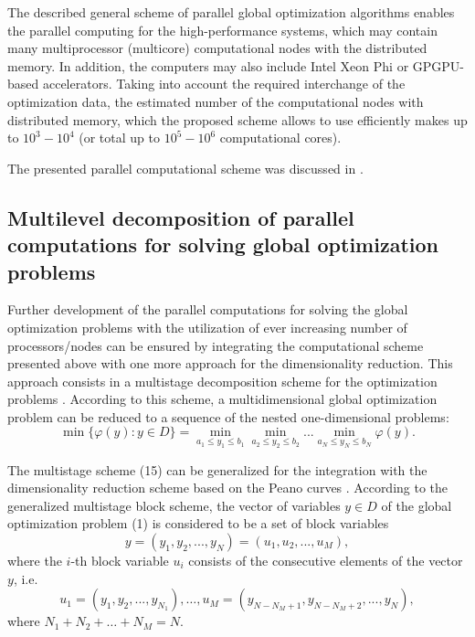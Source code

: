 \documentclass[
11pt,%
tightenlines,%
twoside,%
onecolumn,%
nofloats,%
nobibnotes,%
nofootinbib,%
superscriptaddress,%
noshowpacs,%
centertags]%
{revtex4}
\begin{document}
The described general scheme of parallel global optimization algorithms enables the parallel computing for the high-performance systems, which may contain many multiprocessor (multicore) computational nodes with the distributed memory. In addition, the computers may also include Intel Xeon Phi or GPGPU-based accelerators. Taking into account the required interchange of the optimization data, the estimated number of the computational nodes with distributed memory, which the proposed scheme allows to use efficiently makes up to $10^3-10^4$ (or total up to $10^5-10^6$ computational cores). 

The presented parallel computational scheme was discussed in \cite{Strongin1, Strongin2, Strongin5, Gergel1}.


\subsection{Multilevel decomposition of parallel computations for solving global optimization problems}

Further development of the parallel computations for solving the global optimization problems with the utilization of ever increasing number of processors/nodes can be ensured by integrating the computational scheme presented above with one more approach for the dimensionality reduction. This approach consists in a multistage decomposition scheme for the optimization problems \cite{Strongin2, Sergeyev4, Gergel5}. According to this scheme, a multidimensional global optimization problem can be reduced to a sequence of the nested one-dimensional problems:
\begin{equation}
\min \lbrace \varphi(y): y \in D \rbrace = \min_{a_1 \leq y_1 \leq b_1} \min_{a_2 \leq y_2 \leq b_2} ... \min_{a_N \leq y_N \leq b_N} \varphi(y).
\end{equation}

The multistage scheme (15) can be generalized for the integration with the dimensionality reduction scheme based on the Peano curves \cite{Sysoyev}. According to the generalized multistage block scheme, the vector of variables $y \in D$ of the global optimization problem (1) is considered to be a set of block variables
\[
y = (y_1, y_2, ..., y_N) = (u_1, u_2, ..., u_M),
\]
where the $i$-th block variable $u_i$ consists of the consecutive elements of the vector $y$, i.e.
\[
u_1 = (y_1, y_2, ..., y_{N_1}), \dots, 
u_M = (y_{N-N_M+1}, y_{N-N_M+2}, ..., y_N),
\]
where $N_1 + N_2 + \dots + N_M = N$.
\end{document}

